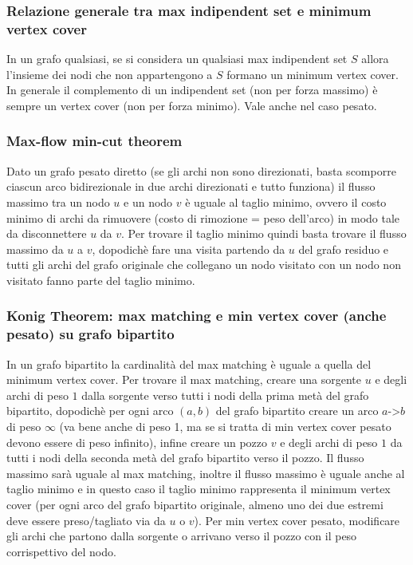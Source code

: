 \subsubsection{Relazione generale tra max indipendent set e minimum vertex cover}
In un grafo qualsiasi, se si considera un qualsiasi max indipendent set $S$ allora l'insieme dei nodi che non appartengono a $S$ formano un minimum vertex cover. In generale il complemento di un indipendent set (non per forza massimo) è sempre un vertex cover (non per forza minimo). Vale anche nel caso pesato.

\subsubsection{Max-flow min-cut theorem}
Dato un grafo pesato diretto (se gli archi non sono direzionati, basta scomporre ciascun arco bidirezionale in due archi direzionati e tutto funziona) il flusso massimo tra un nodo $u$ e un nodo $v$ è uguale al taglio minimo, ovvero il costo minimo di archi da rimuovere (costo di rimozione = peso dell'arco) in modo tale da disconnettere $u$ da $v$. Per trovare il taglio minimo quindi basta trovare il flusso massimo da $u$ a $v$, dopodichè fare una visita partendo da $u$ del grafo residuo e tutti gli archi del grafo originale che collegano un nodo visitato con un nodo non visitato fanno parte del taglio minimo.

\subsubsection{Konig Theorem: max matching e min vertex cover (anche pesato) su grafo bipartito}
In un grafo bipartito la cardinalità del max matching è uguale a quella del minimum vertex cover. Per trovare il max matching, creare una sorgente $u$ e 
degli archi di peso $1$ dalla sorgente verso tutti i nodi della prima metà del grafo bipartito, dopodichè per ogni arco $(a,b)$ del grafo bipartito creare un arco $a$->$b$ di peso $\infty$ 
(va bene anche di peso 1, ma se si tratta di min vertex cover pesato devono essere di peso infinito), infine creare un pozzo $v$ e degli archi di peso $1$ da tutti i nodi della 
seconda metà del grafo bipartito verso il pozzo. Il flusso massimo sarà uguale al max matching, inoltre il flusso massimo è uguale anche al taglio minimo e in questo caso il taglio 
minimo rappresenta il minimum vertex cover (per ogni arco del grafo bipartito originale, almeno uno dei due estremi deve essere preso/tagliato via da $u$ o $v$). Per min vertex cover pesato, modificare gli archi che partono dalla sorgente o arrivano verso il pozzo con il peso corrispettivo del nodo.

